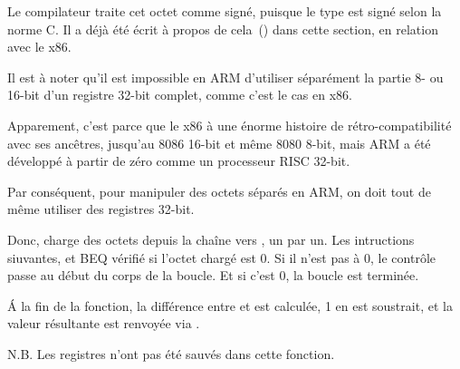 Le compilateur traite cet octet comme signé, puisque le type \Tchar est signé selon
la norme C.
Il a déjà été écrit à propos de cela~() dans cette section, en relation
avec le x86.


Il est à noter qu'il est impossible en ARM d'utiliser séparément la partie 8- ou
16-bit d'un registre 32-bit complet, comme c'est le cas en x86.

Apparement, c'est parce que le x86 à une énorme histoire de rétro-compatibilité
avec ses ancêtres, jusqu'au 8086 16-bit et même 8080 8-bit, mais ARM a été développé
à partir de zéro comme un processeur RISC 32-bit.

Par conséquent, pour manipuler des octets séparés en ARM, on doit tout de même utiliser
des registres 32-bit.

Donc,  charge des octets depuis la chaîne vers , un par un.
Les intructions siuvantes, \CMP et \ac{BEQ} vérifié si l'octet chargé est 0.
Si il n'est pas à 0, le contrôle passe au début du corps de la boucle.
Et si c'est 0, la boucle est terminée.

Á la fin de la fonction, la différence entre  et  est calculée,
1 en est soustrait, et la valeur résultante est renvoyée via .

N.B. Les registres n'ont pas été sauvés dans cette fonction.

